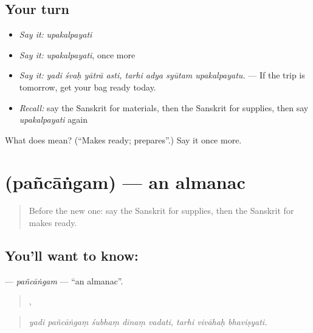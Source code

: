 \subsection*{Your turn}
\begin{itemize}
\raggedright
  \item \emph{Say it:} \emph{upakalpayati}
  \item \emph{Say it:} \emph{upakalpayati}, once more
  \item \emph{Say it:} \emph{yadi śvaḥ yātrā asti, tarhi adya syūtam upakalpayatu.} — If the trip is tomorrow, get your bag ready today.
  \item \emph{Recall:} say the Sanskrit for materials, then the Sanskrit for supplies, then say \emph{upakalpayati} again
\end{itemize}

\begin{tcolorbox}[breakable,colback=teal!4,colframe=teal!35!black,title={Before you move on}]
What does  mean? (\textquotedblleft{}Makes ready; prepares\textquotedblright{}.) Say it once more.
\end{tcolorbox}
\section[\texorpdfstring{\sk{पञ्चांगम्} (pañcāṅgam)}{पञ्चांगम् (pañcāṅgam)}]{ (pañcāṅgam) — an almanac}

\label{lesson:SA-C528-pancangam}



\begin{quote}
Before the new one: say the Sanskrit for supplies, then the Sanskrit for makes ready.
\end{quote}

\subsection*{You'll want to know: }
\textbf{} — \emph{pañcāṅgam} — \textquotedblleft{}an almanac\textquotedblright{}.

\begin{quote}
    ,   
\end{quote}

\begin{quote}
\emph{yadi pañcāṅgaṃ śubhaṃ dinaṃ vadati, tarhi vivāhaḥ bhaviṣyati.}
\end{quote}

